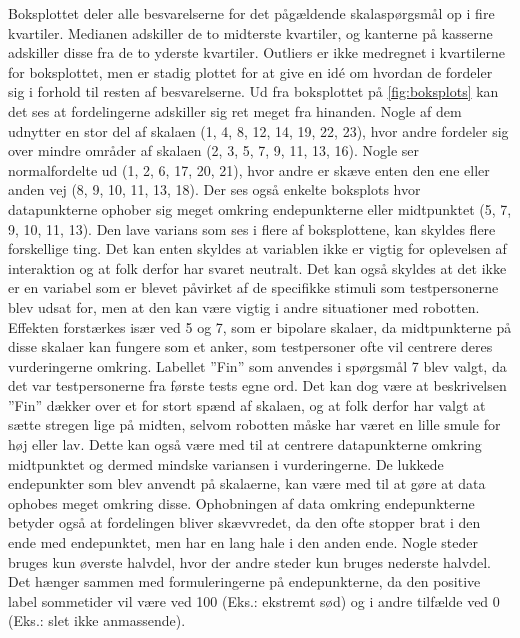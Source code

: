Boksplottet deler alle besvarelserne for det pågældende skalaspørgsmål op i fire kvartiler. Medianen adskiller de to midterste kvartiler, og kanterne på kasserne adskiller disse fra de to yderste kvartiler. Outliers er ikke medregnet i kvartilerne for boksplottet, men er stadig plottet for at give en idé om hvordan de fordeler sig i forhold til resten af besvarelserne. \blankline
%
Ud fra boksplottet på \autoref{fig:boksplots} kan det ses at fordelingerne adskiller sig ret meget fra hinanden. Nogle af dem udnytter en stor del af skalaen (1, 4, 8, 12, 14, 19, 22, 23), hvor andre fordeler sig over mindre områder af skalaen (2, 3, 5, 7, 9, 11, 13, 16). Nogle ser normalfordelte ud (1, 2, 6, 17, 20, 21), hvor andre er skæve enten den ene eller anden vej (8, 9, 10, 11, 13, 18). Der ses også enkelte boksplots hvor datapunkterne ophober sig meget omkring endepunkterne eller midtpunktet (5, 7, 9, 10, 11, 13). \blankline
%
Den lave varians som ses i flere af boksplottene, kan skyldes flere forskellige ting. Det kan enten skyldes at variablen ikke er vigtig for oplevelsen af interaktion og at folk derfor har svaret neutralt. Det kan også skyldes at det ikke er en variabel som er blevet påvirket af de specifikke stimuli som testpersonerne blev udsat for, men at den kan være vigtig i andre situationer med robotten. Effekten forstærkes især ved 5 og 7, som er bipolare skalaer, da midtpunkterne på disse skalaer kan fungere som et anker, som testpersoner ofte vil centrere deres vurderingerne omkring. Labellet ”Fin” som anvendes i spørgsmål 7 blev valgt, da det var testpersonerne fra første tests egne ord. Det kan dog være at beskrivelsen ”Fin” dækker over et for stort spænd af skalaen, og at folk derfor har valgt at sætte stregen lige på midten, selvom robotten måske har været en lille smule for høj eller lav. Dette kan også være med til at centrere datapunkterne omkring midtpunktet og dermed mindske variansen i vurderingerne. \blankline
%
De lukkede endepunkter som blev anvendt på skalaerne, kan være med til at gøre at data ophobes meget omkring disse. Ophobningen af data omkring endepunkterne betyder også at fordelingen bliver skævvredet, da den ofte stopper brat i den ende med endepunktet, men har en lang hale i den anden ende.  \blankline
%
Nogle steder bruges kun øverste halvdel, hvor der andre steder kun bruges nederste halvdel. Det hænger sammen med formuleringerne på endepunkterne, da den positive label sommetider vil være ved 100 (Eks.: ekstremt sød) og i andre tilfælde ved 0 (Eks.: slet ikke anmassende).



